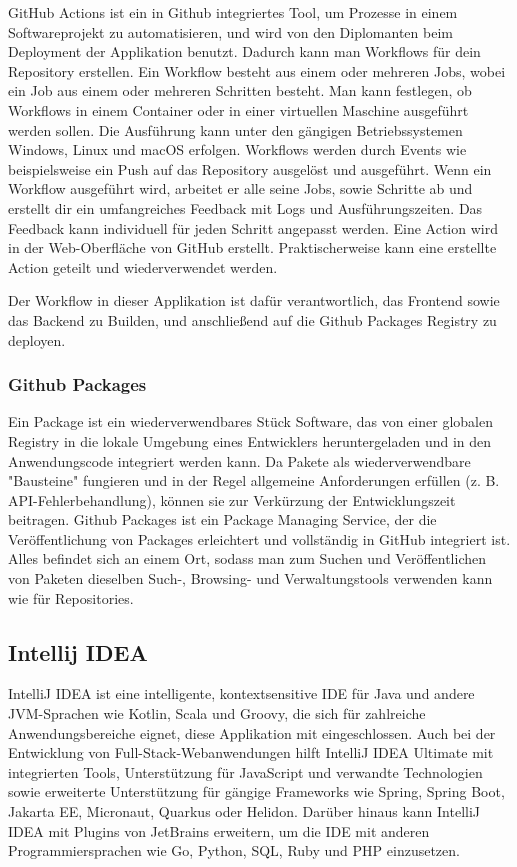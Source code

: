 GitHub Actions ist ein in Github integriertes Tool, um Prozesse in einem Softwareprojekt zu automatisieren, 
und wird von den Diplomanten beim Deployment der Applikation benutzt. 
Dadurch kann man Workflows für dein Repository erstellen. Ein Workflow besteht aus einem oder mehreren Jobs, 
wobei ein Job aus einem oder mehreren Schritten besteht. Man kann festlegen, ob Workflows in einem Container oder in einer virtuellen 
Maschine ausgeführt werden sollen. Die Ausführung kann unter den gängigen Betriebssystemen Windows, Linux und macOS erfolgen. 
Workflows werden durch Events wie beispielsweise ein Push auf das Repository ausgelöst und ausgeführt. Wenn ein Workflow ausgeführt wird, 
arbeitet er alle seine Jobs, sowie Schritte ab und erstellt dir ein umfangreiches Feedback mit Logs und Ausführungszeiten. 
Das Feedback kann individuell für jeden Schritt angepasst werden. Eine Action wird in der Web-Oberfläche von GitHub erstellt. 
Praktischerweise kann eine erstellte Action geteilt und wiederverwendet werden.
\cite{sysarch-github-4}

Der Workflow in dieser Applikation ist dafür verantwortlich, das Frontend sowie das Backend zu Builden, und anschließend auf die Github Packages Registry zu deployen.

\subsubsection{Github Packages}

Ein Package ist ein wiederverwendbares Stück Software, das von einer globalen Registry in die lokale Umgebung eines Entwicklers heruntergeladen und 
in den Anwendungscode integriert werden kann. Da Pakete als wiederverwendbare "Bausteine" fungieren und in der Regel allgemeine Anforderungen erfüllen 
(z. B. API-Fehlerbehandlung), können sie zur Verkürzung der Entwicklungszeit beitragen. Github Packages ist ein Package Managing Service, 
der die Veröffentlichung von Packages erleichtert und vollständig in GitHub integriert ist. Alles befindet sich an einem Ort, 
sodass man zum Suchen und Veröffentlichen von Paketen dieselben Such-, Browsing- und Verwaltungstools verwenden kann wie für Repositories.
\cite{sysarch-github-5}

\subsection{Intellij IDEA}

IntelliJ IDEA ist eine intelligente, kontextsensitive IDE für Java und andere JVM-Sprachen wie Kotlin, Scala und Groovy, die sich für zahlreiche 
Anwendungsbereiche eignet, diese Applikation mit eingeschlossen. Auch bei der Entwicklung von Full-Stack-Webanwendungen hilft IntelliJ IDEA Ultimate mit integrierten Tools, 
Unterstützung für JavaScript und verwandte Technologien sowie erweiterte Unterstützung für gängige Frameworks wie Spring, Spring Boot, Jakarta EE, Micronaut, 
Quarkus oder Helidon. Darüber hinaus kann IntelliJ IDEA mit Plugins von JetBrains erweitern, um die IDE mit anderen Programmiersprachen wie 
Go, Python, SQL, Ruby und PHP einzusetzen. 
\cite{sysarch-intellij-1}

